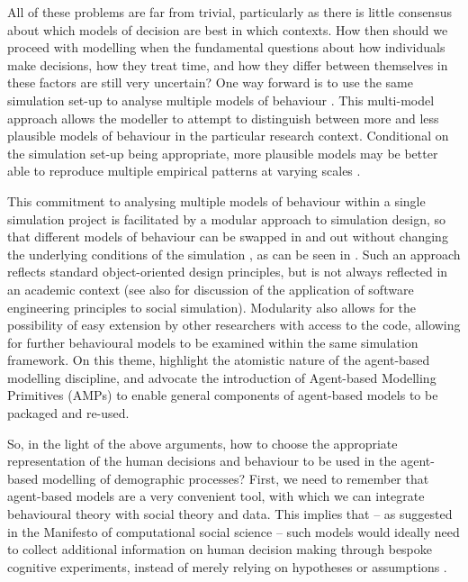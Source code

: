 \documentclass{article}
\begin{document}
All of these problems are far from trivial, particularly as there is little consensus about which models of decision are best in which contexts. How then should we proceed with modelling when the fundamental questions about how individuals make decisions, how they treat time, and how they differ between themselves in these factors are still very uncertain? One way forward is to use the same simulation set-up to analyse multiple models of behaviour \citep{Grimm2005, Epstein2013, Rossiter2014}. This multi-model approach allows the modeller to attempt to distinguish between more and less plausible models of behaviour in the particular research context. Conditional on the simulation set-up being appropriate, more plausible models may be better able to reproduce multiple empirical patterns at varying scales \citep{Werker2004, Bianchi2008}.

This commitment to analysing multiple models of behaviour within a single simulation project is facilitated by a modular approach to simulation design, so that different models of behaviour can be swapped in and out without changing the underlying conditions of the simulation \citep{Epstein2013}, as can be seen in \citet{Gray2016}. Such an approach reflects standard object-oriented design principles, but is not always reflected in an academic context (see also \citet{Rossiter2015} for discussion of the application of software engineering principles to social simulation). Modularity also allows for the possibility of easy extension by other researchers with access to the code, allowing for further behavioural models to be examined within the same simulation framework. On this theme, \cite{Bell2015} highlight the atomistic nature of the agent-based modelling discipline, and advocate the introduction of Agent-based Modelling Primitives (AMPs) to enable general components of agent-based models to be packaged and re-used. 

So, in the light of the above arguments, how to choose the appropriate representation of the human decisions and behaviour to be used in the agent-based modelling of demographic processes? First, we need to remember that agent-based models are a very convenient tool, with which we can integrate behavioural theory with social theory and data. This implies that -- as suggested in the Manifesto of computational social science \citep{Conte} -- such models would ideally need to collect additional information on human decision making through bespoke cognitive experiments, instead of merely relying on hypotheses or assumptions \citep{Courgeau}. 
\end{document}
